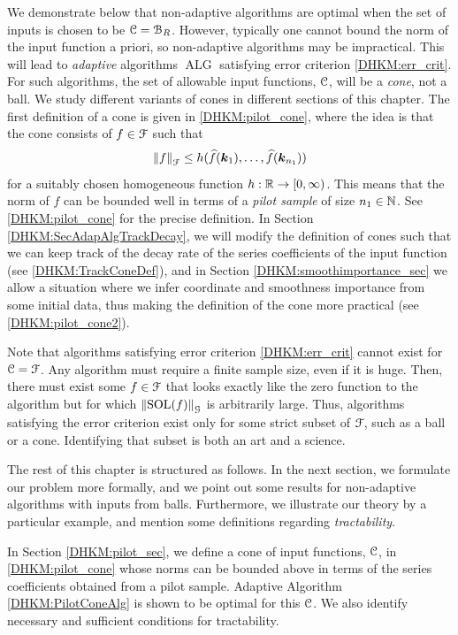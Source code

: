 \documentclass[USenglish]{article}
\theoremstyle{dgthm}
\theoremstyle{dgthm}
\theoremstyle{dgthm}
\theoremstyle{dgthm}
\theoremstyle{dgdef}
\theoremstyle{definition}
\DeclareMathOperator{\SOL}{SOL}
\DeclareMathOperator{\ALG}{ALG}
\newcommand{\hf}{\widehat{f}}
\newcommand{\norm}[2][{}]{\ensuremath{\left \lVert #2 \right \rVert}_{#1}}
\begin{document}
{We demonstrate below that non-adaptive algorithms are optimal when the set of inputs is chosen to be ${\mathcal{C}} = {\mathcal{B}}_R$. However, typically one cannot bound the norm of the input function a priori, so non-adaptive algorithms may be impractical. 
This will lead to \emph{adaptive} algorithms $\ALG$ satisfying error criterion \eqref{DHKM:err_crit}.  For such algorithms, the set of allowable input functions, ${\mathcal{C}}$, will be a \emph{cone}, not a ball. We study different variants of cones in different sections of this chapter. The first definition of a cone is given in \eqref{DHKM:pilot_cone}, 
where the idea is that the cone consists of $f\in{\mathcal{F}}$ such that 
$$
  \norm[\calF]{f}\le h (\hf(\bsk_1),\ldots,\hf (\bsk_{n_1}))
$$
for a suitably chosen homogeneous function $h:{\mathbb{R}}\rightarrow [0,\infty)$. This means that the norm of $f$ can be bounded well in terms of 
a \emph{pilot sample} of size $n_1\in{\mathbb{N}}$. See \eqref{DHKM:pilot_cone} for the precise definition. In Section \ref{DHKM:SecAdapAlgTrackDecay}, we will modify the definition of cones such that we can keep track of the decay rate of the series coefficients of the input function (see \eqref{DHKM:TrackConeDef}), 
and in Section \ref{DHKM:smoothimportance_sec} we allow a situation 
where we infer coordinate and smoothness importance from some initial data, thus making the definition of the cone more practical (see  
\eqref{DHKM:pilot_cone2}).

Note that algorithms satisfying error criterion \eqref{DHKM:err_crit} cannot exist for ${\mathcal{C}} = {\mathcal{F}}$. Any algorithm must require a finite sample size, even if it is huge.  Then, there must exist some $f \in {\mathcal{F}}$ that looks exactly like the zero function to the algorithm but for which $\norm[\calG]{\SOL(f)}$ is arbitrarily large.  Thus, algorithms satisfying the error criterion  exist only for some strict subset of ${\mathcal{F}}$, such as a ball or a cone.  Identifying that subset is both an art and a science.


The rest of this chapter is structured as follows. In the next section, we formulate our problem more formally, and we point out some results for non-adaptive algorithms with inputs from balls. Furthermore, we illustrate our theory by 
a particular example, and mention some definitions regarding \emph{tractability}. 


In Section \ref{DHKM:pilot_sec}, we define a cone of input functions, ${\mathcal{C}}$, in \eqref{DHKM:pilot_cone} whose norms can be bounded above in terms of the series coefficients obtained from a pilot sample.  Adaptive Algorithm \ref{DHKM:PilotConeAlg} is shown to be optimal for this ${\mathcal{C}}$.  We also identify necessary and sufficient conditions for tractability.

}
\end{document}
